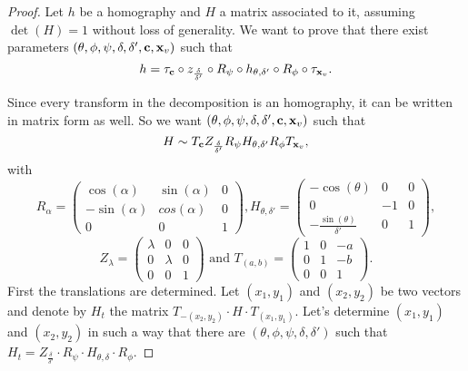 \begin{proof}

Let $h$ be a homography and $H$ a matrix associated to it, assuming $\det (H)=1$ without loss of generality. We want to prove that there exist parameters $(\theta,\phi,\psi,\delta,\delta',\mathbf{c},\mathbf{x}_v)$ such that
\begin{equation*}
h= \tau_{\mathbf{c}} \circ z_{\frac{\delta}{\delta'}}\circ R_{\psi} \circ h_{\theta,\delta'} \circ R_{\phi} \circ \tau_{\mathbf{x}_v}.
\end{equation*}

\noindent Since every transform in the decomposition is an homography, it can be written in matrix form as well. So we want $(\theta,\phi,\psi,\delta,\delta',\mathbf{c},\mathbf{x}_v)$ such that
 \begin{equation*}
H\sim T_{\mathbf{c}} Z_{\frac{\delta}{\delta'}}  R_{\psi}  H_{\theta,\delta'} R_{\phi}  T_{\mathbf{x}_v},
\end{equation*}
with
\begin{equation*}
R_{\alpha}=\begin{pmatrix}
\cos(\alpha)&\sin(\alpha)&0\\-\sin(\alpha)&cos(\alpha)&0\\0&0&1
\end{pmatrix}
, H_{\theta,\delta'}=\begin{pmatrix}
-\cos(\theta)&0&0\\0&-1&0\\-\frac{\sin(\theta)}{\delta'}&0&1
\end{pmatrix},
\end{equation*}
\begin{equation*}
Z_{\lambda}=\begin{pmatrix}
\lambda&0&0\\0&\lambda&0\\0&0&1
\end{pmatrix}
\text{ and } T_{(a,b)}=\begin{pmatrix}
1&0&-a\\0&1&-b\\0&0&1
\end{pmatrix}.
\end{equation*}
First the translations are determined. Let $(x_1 , y_1 )$ and $(x_2 , y_2 )$ be two vectors and denote by $H_t$ the matrix $T_{-(x_2 , y_2 )}  \cdot H \cdot T_{(x_1 , y_1 )}$. Let's determine $(x_1 , y_1 )$ and $(x_2 , y_2 )$ in such a way that there are  $(\theta,\phi,\psi,\delta,\delta')$ such that $H_t=Z_{\frac{\delta}{\delta'}} \cdot R_{\psi} \cdot H_{\theta,\delta} \cdot R_{\phi}$.


\end{proof}
